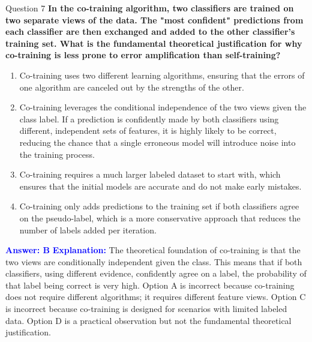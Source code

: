 \documentclass[8pt]{beamer}  %
\begin{document}
	\begin{frame}{Question 7}
		\textbf{In the co-training algorithm, two classifiers are trained on two separate views of the data. The "most confident" predictions from each classifier are then exchanged and added to the other classifier's training set. What is the fundamental theoretical justification for why co-training is less prone to error amplification than self-training?}
		\begin{enumerate}
			\item Co-training uses two different learning algorithms, ensuring that the errors of one algorithm are canceled out by the strengths of the other.
			\item Co-training leverages the conditional independence of the two views given the class label. If a prediction is confidently made by both classifiers using different, independent sets of features, it is highly likely to be correct, reducing the chance that a single erroneous model will introduce noise into the training process.
			\item Co-training requires a much larger labeled dataset to start with, which ensures that the initial models are accurate and do not make early mistakes.
			\item Co-training only adds predictions to the training set if both classifiers agree on the pseudo-label, which is a more conservative approach that reduces the number of labels added per iteration.
		\end{enumerate}
		\vspace{0.2cm}
		\textcolor{blue}{\textbf{Answer: B}}
		\vspace{0.2cm}
		\textcolor{blue}{\textbf{Explanation:}} The theoretical foundation of co-training is that the two views are conditionally independent given the class. This means that if both classifiers, using different evidence, confidently agree on a label, the probability of that label being correct is very high. Option A is incorrect because co-training does not require different algorithms; it requires different feature views. Option C is incorrect because co-training is designed for scenarios with limited labeled data. Option D is a practical observation but not the fundamental theoretical justification.
	\end{frame}
	
\end{document}
